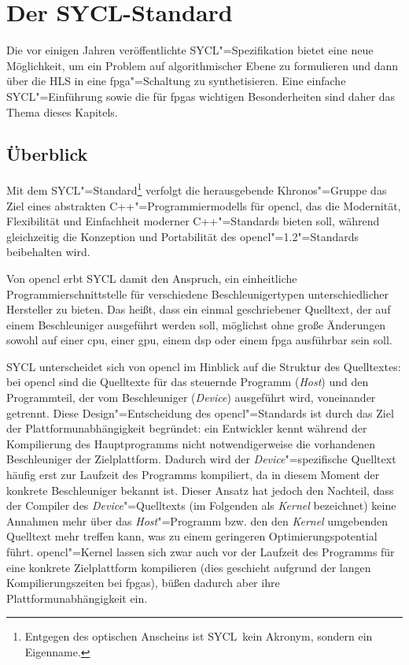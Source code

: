 \chapter{Der SYCL-Standard}\label{sycl}

Die vor einigen Jahren veröffentlichte SYCL"=Spezifikation bietet eine neue
Möglichkeit, um ein Problem auf algorithmischer Ebene zu formulieren und dann
über die HLS in eine \gls{fpga}"=Schaltung zu synthetisieren. Eine einfache
SYCL"=Einführung sowie die für \gls{fpga}s wichtigen Besonderheiten sind daher
das Thema dieses Kapitels.

\section{Überblick}\label{sycl:ueberblick}

Mit dem SYCL"=Standard\footnote{Entgegen des optischen Anscheins ist
\glqq SYCL\grqq\ kein Akronym, sondern ein Eigenname.} verfolgt die
herausgebende Khronos"=Gruppe das Ziel eines abstrakten C++"=Programmiermodells
für \gls{opencl}, das die Modernität, Flexibilität und Einfachheit moderner
C++"=Standards bieten soll, während gleichzeitig die Konzeption und Portabilität
des \gls{opencl}"=1.2"=Standards beibehalten wird.
\cite[vgl.][15]{sycl2019}

Von \gls{opencl} erbt SYCL damit den Anspruch, ein einheitliche
Programmierschnittstelle für verschiedene Beschleunigertypen unterschiedlicher
Hersteller zu bieten. Das heißt, dass ein einmal geschriebener Quelltext, der
auf einem Beschleuniger ausgeführt werden soll, möglichst ohne große Änderungen
sowohl auf einer \gls{cpu}, einer \gls{gpu}, einem \gls{dsp} oder einem
\gls{fpga} ausführbar sein soll.

SYCL unterscheidet sich von \gls{opencl} im Hinblick auf die Struktur des
Quelltextes: bei \gls{opencl} sind die Quelltexte für das steuernde Programm
(\textit{Host}) und den Programmteil, der vom Beschleuniger (\textit{Device})
ausgeführt wird, voneinander getrennt. Diese Design"=Entscheidung des
\gls{opencl}"=Standards ist durch das Ziel der Plattformunabhängigkeit
begründet: ein Entwickler kennt während der Kompilierung des Hauptprogramms
nicht notwendigerweise die vorhandenen Beschleuniger der Zielplattform. Dadurch
wird der \textit{Device}"=spezifische Quelltext häufig erst zur Laufzeit des
Programms kompiliert, da in diesem Moment der konkrete Beschleuniger bekannt
ist. Dieser Ansatz hat jedoch den Nachteil, dass der Compiler des
\textit{Device}"=Quelltexts (im Folgenden als \textit{Kernel} bezeichnet) keine
Annahmen mehr über das \textit{Host}"=Programm bzw. den den \textit{Kernel}
umgebenden Quelltext mehr treffen kann, was zu einem geringeren
Optimierungspotential führt. \gls{opencl}"=Kernel lassen sich zwar auch vor
der Laufzeit des Programms für eine konkrete Zielplattform kompilieren (dies
geschieht aufgrund der langen Kompilierungszeiten bei \gls{fpga}s), büßen
dadurch aber ihre Plattformunabhängigkeit ein.

